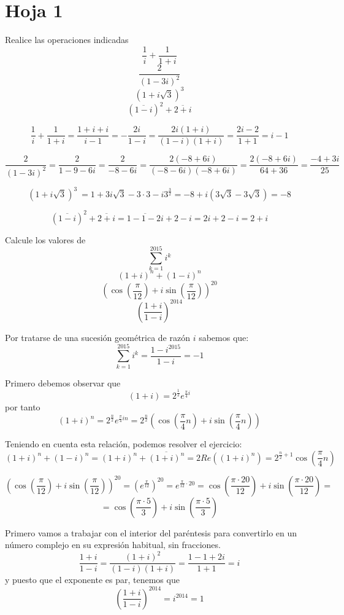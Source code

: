 
\section{Hoja 1}
%
\begin{problem}[1]
Realice las operaciones indicadas
\ppart
\[\frac{1}{i}+\frac{1}{1+i}\]
\ppart
\[\frac{2}{(1-3i)^2}\]
\ppart
\[(1+i\sqrt{3})^3\]
\ppart
\[(\overline{1-i})^2+\overline{2+i}\]

\solution

\spart
\[\frac{1}{i}+\frac{1}{1+i} = \frac{1+i+i}{i-1} = -\frac{2i}{1-i} = \frac{2i(1+i)}{(1-i)(1+i)} = \frac{2i-2}{1+1}=i-1\]

\spart
\[\frac{2}{(1-3i)^2} = \frac{2}{1-9-6i} = \frac{2}{-8-6i}=\frac{2(-8+6i)}{(-8-6i)(-8+6i)} = \frac{2(-8+6i)}{64+36} = \frac{-4+3i}{25}\]

\newpage
\spart
\[(1+i\sqrt{3})^3\ = 1 +3i\sqrt{3}-3\cdot 3-i3^{\frac{3}{2}} = -8 +i (3\sqrt{3}-3\sqrt{3}) = -8\]

\spart
\[(\overline{1-i})^2+\overline{2+i} = \overline{1-1-2i}+2-i = 2i+2-i=2+i\]
\end{problem}

\begin{problem}[2]
Calcule los valores de
\ppart
\[\sum_{k=1}^{2015}i^k\]
\ppart
\[(1+i)^n+(1-i)^n\]
\ppart
\[\left( \cos \left( \frac{\pi}{12} \right) + i \sin \left( \frac{\pi}{12} \right)\right)^{20}\]
\ppart
\[\left(\frac{1+i}{1-i}\right)^{2014}\]
\solution

\spart
Por tratarse de una sucesión geométrica de razón $i$ sabemos que:
\[\sum_{k=1}^{2015}i^k = \frac{1-i^{2015}}{1-i}=-1\]

\spart
Primero debemos observar que
\large
\[(1+i) = 2^{\frac{1}{2}}e^{\frac{\pi}{4}i}\]
\normalsize
por tanto
\[ (1+i)^n= 2^{\frac{n}{2}}e^{\frac{\pi}{4}in} = 2^{\frac{n}{2}}\left(\cos\left(\frac{\pi}{4}n\right)+i \sin\left(\frac{\pi}{4}n\right)\right)\]

Teniendo en cuenta esta relación, podemos resolver el ejercicio:
\[(1+i)^n+(1-i)^n = (1+i)^n+\overline{(1+i)^n} = 2 Re((1+i)^n)=2^{\frac{n}{2}+1}\cos\left(\frac{\pi}{4}n\right)\]

\spart
\[\left( \cos \left( \frac{\pi}{12} \right) + i \sin \left( \frac{\pi}{12} \right)\right)^{20}=\left(e^{\frac{\pi}{12}}\right)^{20} = e^{\frac{\pi}{12}\cdot 20} = \cos \left( \frac{\pi\cdot 20}{12} \right) + i \sin \left( \frac{\pi\cdot 20}{12} \right) =\]
\[=\cos \left( \frac{\pi\cdot 5}{3} \right) + i \sin \left( \frac{\pi \cdot 5}{3} \right)\]

\spart
Primero vamos a trabajar con el interior del paréntesis para convertirlo en un número complejo en su expresión habitual, sin fracciones.
\[\frac{1+i}{1-i}=\frac{(1+i)^2}{(1-i)(1+i)} = \frac{1-1+2i}{1+1} = i\]
y puesto que el exponente es par, tenemos que
\[\left(\frac{1+i}{1-i}\right)^{2014}=i^{2014}=1\]
\end{problem}

